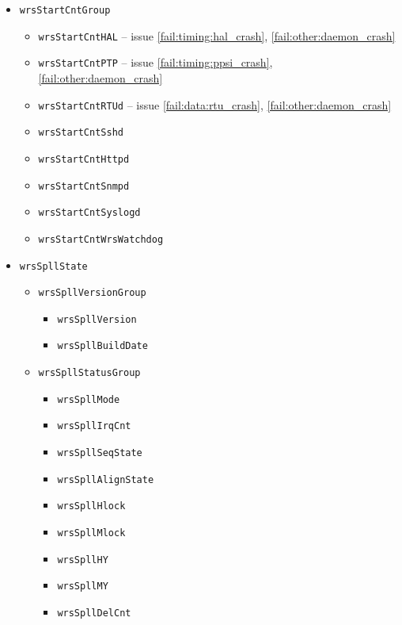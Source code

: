 \begin{itemize}
  \item \texttt{wrsStartCntGroup}
    \begin{itemize}
      \item \texttt{wrsStartCntHAL} -- issue \ref{fail:timing:hal_crash}, \ref{fail:other:daemon_crash}
      \item \texttt{wrsStartCntPTP} -- issue \ref{fail:timing:ppsi_crash}, \ref{fail:other:daemon_crash}
      \item \texttt{wrsStartCntRTUd} -- issue \ref{fail:data:rtu_crash}, \ref{fail:other:daemon_crash}
      \item \texttt{wrsStartCntSshd}
      \item \texttt{wrsStartCntHttpd}
      \item \texttt{wrsStartCntSnmpd}
      \item \texttt{wrsStartCntSyslogd}
      \item \texttt{wrsStartCntWrsWatchdog}
    \end{itemize}

  \item \texttt{wrsSpllState}
    \begin{itemize}
      \item \texttt{wrsSpllVersionGroup}
	\begin{itemize}
	  \item \texttt{wrsSpllVersion}
	  \item \texttt{wrsSpllBuildDate}
	\end{itemize}
      \item \texttt{wrsSpllStatusGroup}
	\begin{itemize}
	  \item \texttt{wrsSpllMode}
	  \item \texttt{wrsSpllIrqCnt}
	  \item \texttt{wrsSpllSeqState}
	  \item \texttt{wrsSpllAlignState}
	  \item \texttt{wrsSpllHlock}
	  \item \texttt{wrsSpllMlock}
	  \item \texttt{wrsSpllHY}
	  \item \texttt{wrsSpllMY}
	  \item \texttt{wrsSpllDelCnt}
	\end{itemize}
    \end{itemize}


\end{itemize}
